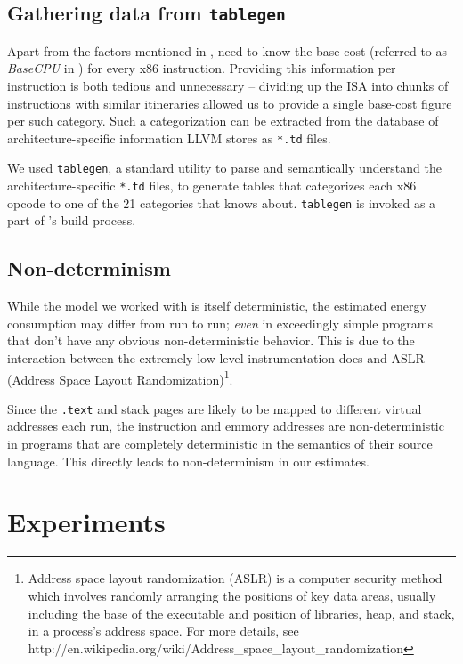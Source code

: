 \subsection{Gathering data from \texttt{tablegen}}
\label{sec:pintool-tablegen}

Apart from the factors mentioned in , \wattage need
to know the base cost (referred to as \textit{BaseCPU} in
\cite{steinke}) for every x86 instruction.  Providing this information
per instruction is both tedious and unnecessary -- dividing up the ISA
into chunks of instructions with similar itineraries allowed us to
provide a single base-cost figure per such category.  Such a
categorization can be extracted from the database of
architecture-specific information LLVM stores as \texttt{*.td} files.

We used \texttt{tablegen}, a standard utility to parse and
semantically understand the architecture-specific \texttt{*.td} files,
to generate tables that categorizes each x86 opcode to one of the 21
categories that \wattage knows about.  \texttt{tablegen} is invoked as
a part of \wattage's build process.

\subsection{Non-determinism}

While the model we worked with is itself deterministic, the estimated
energy consumption may differ from run to run; \textit{even} in
exceedingly simple programs that don't have any obvious
non-deterministic behavior.  This is due to the interaction between
the extremely low-level instrumentation \wattage does and ASLR
(Address Space Layout Randomization)\footnote{ Address space layout
  randomization (ASLR) is a computer security method which involves
  randomly arranging the positions of key data areas, usually
  including the base of the executable and position of libraries,
  heap, and stack, in a process's address space.  For more details,
  see
  http://en.wikipedia.org/wiki/Address\_space\_layout\_randomization}.

Since the \texttt{.text} and stack pages are likely to be mapped to
different virtual addresses each run, the instruction and emmory
addresses are non-deterministic in programs that are completely
deterministic in the semantics of their source language.  This
directly leads to non-determinism in our estimates.

\section{Experiments}

